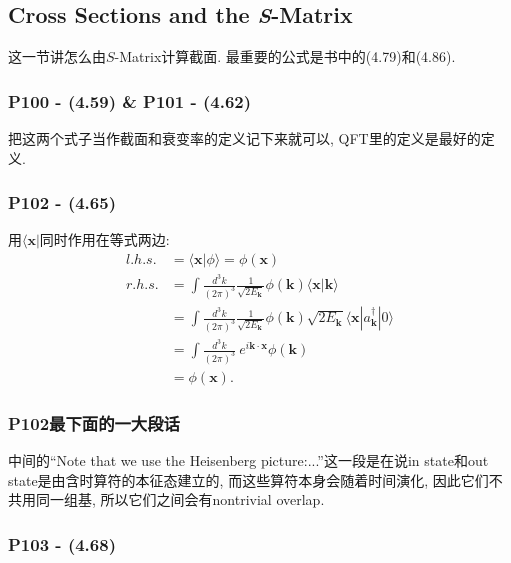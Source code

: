\documentclass[cn,hazy,green,11pt,device=normal,chinesefont=founder]{elegantnote}
\begin{document}
\subsection{Cross Sections and the \textit{S}-Matrix}

这一节讲怎么由$S$-Matrix计算截面. 最重要的公式是书中的(4.79)和(4.86). 

\subsubsection{P100 - (4.59) \& P101 - (4.62)}

把这两个式子当作截面和衰变率的定义记下来就可以, QFT里的定义是最好的定义. 

\subsubsection{P102 - (4.65)}

用$\langle \mathbf{x}|$同时作用在等式两边: 
\begin{equation}
  \begin{aligned}
    l.h.s. &= \langle \mathbf{x}|\phi \rangle = \phi(\mathbf{x}) \\ 
    r.h.s. &= \int\frac{d^3 k}{(2\pi)^3}\frac{1}{\sqrt{2E_{\mathbf{k}}}}\phi(\mathbf{k})\langle \mathbf{x}|\mathbf{k} \rangle \\
    &= \int\frac{d^3 k}{(2\pi)^3}\frac{1}{\sqrt{2E_{\mathbf{k}}}}\phi(\mathbf{k})\sqrt{2E_{\mathbf{k}}}\langle \mathbf{x}|a^{\dagger}_{\mathbf{k}}|0 \rangle \\
    &= \int\frac{d^3 k}{(2\pi)^3}\ e^{i\mathbf{k}\cdot\mathbf{x}}\phi(\mathbf{k}) \\
    &= \phi(\mathbf{x}).
  \end{aligned}
\end{equation}

\subsubsection{P102最下面的一大段话}

\begin{remark}[个人理解]
  中间的“Note that we use the Heisenberg picture:...”这一段是在说in state和out state是由含时算符的本征态建立的, 而这些算符本身会随着时间演化, 因此它们不共用同一组基, 所以它们之间会有nontrivial overlap. 
\end{remark}

\subsubsection{P103 - (4.68)}
\end{document}
